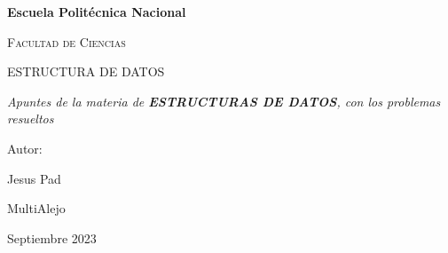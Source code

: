 \documentclass[12pt]{article}
\begin{document}
\begin{titlepage}
\centering
{\bfseries\LARGE Escuela Politécnica Nacional \par}
\vspace{1cm}
{\scshape\Large Facultad de Ciencias \par}
\vspace{3cm}
{\scshape\Huge ESTRUCTURA DE DATOS \par}
\vspace{3cm}
{\itshape\Large Apuntes de la materia de \textbf{ESTRUCTURAS DE DATOS}, con los problemas resueltos \par}
\vfill
{\Large Autor: \par}
{\Large Jesus Pad \par}
{\Large MultiAlejo \par}
\vfill
{\Large Septiembre 2023 \par}

\end{titlepage}
\tableofcontents
\newpage
\vspace{\baselineskip} %
\end{document}
